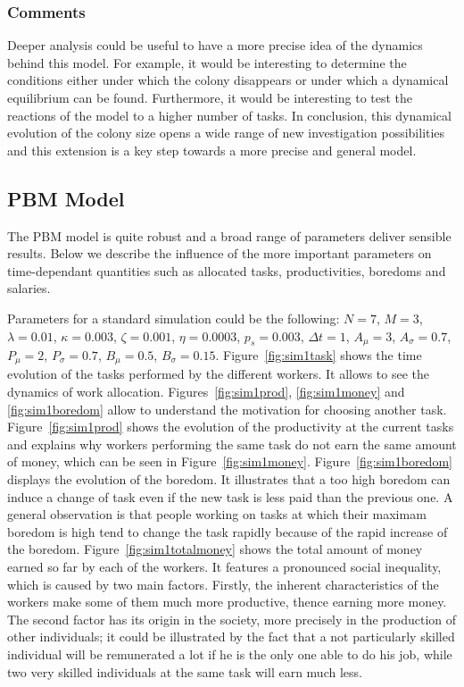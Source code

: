 \subsubsection{Comments}

Deeper analysis could be useful to have a more precise idea of the
dynamics behind this model. For example, it would be interesting to
determine the conditions either under which the colony disappears or under
which a dynamical equilibrium can be found. Furthermore, it would
be interesting to test the reactions of the model to a higher number
of tasks. In conclusion, this dynamical evolution of the colony size
opens a wide range of new investigation possibilities and this extension
is a key step towards a more precise and general model.


 

\subsection{PBM Model}
The PBM model is quite robust and a broad range of parameters deliver sensible results. Below we describe the influence of the more important parameters on time-dependant quantities such as allocated tasks, productivities, boredoms and salaries. 

Parameters for a standard simulation could be the following: $N=7$, $M=3$, $\lambda=0.01$, $\kappa=0.003$, $\zeta=0.001$, $\eta=0.0003$, $p_s=0.003$, $\Delta t=1$, $A_\mu=3$, $A_\sigma=0.7$, $P_\mu=2$, $P_\sigma=0.7$, $B_\mu=0.5$, $B_\sigma=0.15$. Figure~\ref{fig:sim1task} shows the time evolution of the tasks performed by the different workers. It allows to see the dynamics of work allocation. Figures~\ref{fig:sim1prod}, \ref{fig:sim1money} and \ref{fig:sim1boredom} allow to understand the motivation for choosing another task. Figure~\ref{fig:sim1prod} shows the evolution of the productivity at the current tasks and explains why workers performing the same task do not earn the same amount of money, which can be seen in Figure~\ref{fig:sim1money}. Figure~\ref{fig:sim1boredom} displays the evolution of the boredom. It illustrates that a too high boredom can induce a change of task even if the new task is less paid than the previous one. A general observation is that people working on tasks at which their maximam boredom is high tend to change the task rapidly because of the rapid increase of the boredom. Figure~\ref{fig:sim1totalmoney} shows the total amount of money earned so far by each of the workers. It features a pronounced social inequality, which is caused by two main factors. Firstly, the inherent characteristics of the workers make some of them much more productive, thence earning more money. The second factor has its origin in the society, more precisely in the production of other individuals; it could be illustrated by the fact that a not particularly skilled individual will be remunerated a lot if he is the only one able to do his job, while two very skilled individuals at the same task will earn much less.

